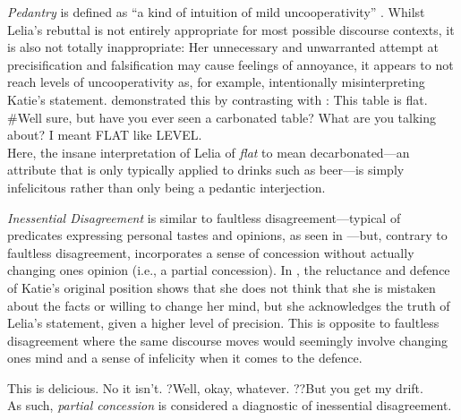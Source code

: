\textit{Pedantry} is defined as \enquote{a kind of intuition of mild uncooperativity} \parencite[p. 114]{Klecha2014}. Whilst Lelia's rebuttal is not entirely appropriate for most possible discourse contexts, it is also not totally inappropriate: Her unnecessary and unwarranted attempt at precisification and falsification may cause feelings of annoyance, it appears to not reach levels of uncooperativity as, for example, intentionally misinterpreting Katie's statement. \textcite{Klecha2014} demonstrated this by contrasting  with :
\pex{}\a{}This table is flat.
\a{}\#Well sure, but have you ever seen a carbonated table?
\a{}What are you talking about? I meant \MakeUppercase{flat} like \MakeUppercase{level}.\\\emptyfill\parencite[p. 114]{Klecha2014}
\xe
Here, the insane interpretation of Lelia of \textit{flat} to mean decarbonated---an attribute that is only typically applied to drinks such as beer---is simply infelicitous rather than only being a pedantic interjection.

\textit{Inessential Disagreement} is similar to faultless disagreement---typical of predicates expressing personal tastes and opinions, as seen in ---but, contrary to faultless disagreement, incorporates a sense of concession without actually changing ones opinion (i.e., a partial concession). In , the reluctance and defence of Katie's original position shows that she does not think that she is mistaken about the facts or willing to change her mind, but she acknowledges the truth of Lelia's statement, given a higher level of precision. This is opposite to faultless disagreement where the same discourse moves would seemingly involve changing ones mind and a sense of infelicity when it comes to the defence.\enlargethispage*{2\baselineskip}

\pex{}\a{}This is delicious.
\a{}No it isn’t.
\a{}?Well, okay, whatever. ??But you get my drift.\\\emptyfill\parencite[adapted from][p. 114]{Klecha2014}
\xe
As such, \textit{partial concession} is considered a diagnostic of inessential disagreement.

